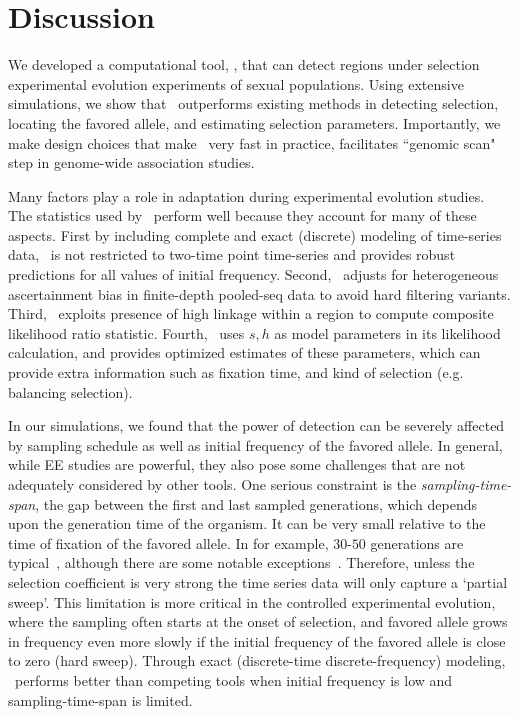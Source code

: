 \section{Discussion}
We developed a computational tool, \comale, that can detect regions
under selection experimental evolution experiments of sexual
populations. Using extensive simulations, we show that \comale\
outperforms existing methods in detecting selection, locating the
favored allele, and estimating selection parameters. Importantly, we
make design choices that make \comale\ very fast in practice, facilitates 
``genomic scan" step in genome-wide association studies.


Many factors play a role in adaptation during experimental evolution
studies. The statistics used by \comale\ perform well because they
account for many of these aspects. First by including complete and exact 
(discrete) modeling of time-series data, \comale\ is not restricted to two-time 
point time-series and provides robust predictions for all values of initial 
frequency. Second, \comale\ adjusts for heterogeneous ascertainment bias in 
finite-depth pooled-seq data to avoid hard filtering variants.
Third, \comale\ exploits presence of high linkage within a region to compute 
composite likelihood ratio statistic. 
Fourth, \comale\ uses $s,h$ as model
parameters in its likelihood calculation, and provides optimized
estimates of these parameters, which can provide extra information such as 
fixation time, and kind of selection (e.g. balancing selection).

In our simulations, we found that the power of detection can be
severely affected by sampling schedule as well as initial frequency of
the favored allele.
In general, while EE studies are powerful, they also pose some
challenges that are not adequately considered by other tools. One
serious constraint is the \emph{sampling-time-span}, the gap between
the first and last sampled generations, which depends upon the
generation time of the organism. It can be very small relative to the
time of fixation of the favored allele. In \dmel for
example, $30$-$50$ generations are typical~\cite{kofler2013guide}, although 
there are some notable exceptions~\cite{zhou2011experimental}. 
Therefore, unless the selection coefficient is very strong the time series data 
will only capture a `partial sweep'. This limitation is more critical in the
controlled experimental evolution, where the sampling often starts at
the onset of selection, and favored allele grows in frequency even
more slowly if the initial frequency of the favored allele is close to
zero (hard sweep). Through exact (discrete-time discrete-frequency) modeling, 
\comale\ performs better
than competing tools when initial frequency is low and sampling-time-span is 
limited.


